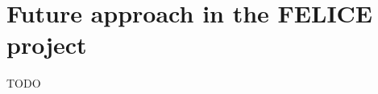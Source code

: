 \documentclass[9pt,conference]{IEEEtran}
\begin{document}

    \section{Future approach in the FELICE project}
    \label{section:framework_1}
    TODO
\end{document}

